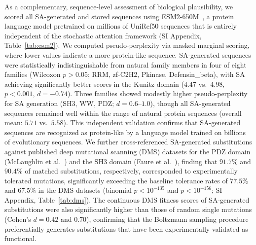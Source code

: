 As a complementary, sequence-level assessment of biological plausibility, we scored all SA-generated and stored sequences using ESM2-650M~\cite{linEvolutionaryScaleModeling2023}, a protein language model pretrained on millions of UniRef50 sequences that is entirely independent of the stochastic attention framework (SI Appendix, Table~\ref{tab:esm2}). We computed pseudo-perplexity via masked marginal scoring, where lower values indicate a more protein-like sequence. SA-generated sequences were statistically indistinguishable from natural family members in four of eight families (Wilcoxon $p > 0.05$; RRM, zf-C2H2, Pkinase, Defensin\_beta), with SA achieving significantly better scores in the Kunitz domain ($4.47$ vs.\ $4.98$, $p < 0.001$, $d{=}{-}0.74$). Three families showed modestly higher pseudo-perplexity for SA generation (SH3, WW, PDZ; $d{=}0.6$--$1.0$), though all SA-generated sequences remained well within the range of natural protein sequences (overall mean: $5.71$ vs.\ $5.58$). This independent validation confirms that SA-generated sequences are recognized as protein-like by a language model trained on billions of evolutionary sequences. We further cross-referenced SA-generated substitutions against published deep mutational scanning (DMS) datasets for the PDZ domain (McLaughlin et al.~\cite{mclaughlinSpatialArchitecture2012}) and the SH3 domain (Faure et al.~\cite{faureDoubleDMS2022}), finding that $91.7\%$ and $90.4\%$ of matched substitutions, respectively, corresponded to experimentally tolerated mutations, significantly exceeding the baseline tolerance rates of $77.5\%$ and $67.5\%$ in the DMS datasets (binomial $p < 10^{-135}$ and $p < 10^{-156}$; SI Appendix, Table~\ref{tab:dms}). The continuous DMS fitness scores of SA-generated substitutions were also significantly higher than those of random single mutations (Cohen's $d{=}0.42$ and $0.70$), confirming that the Boltzmann sampling procedure preferentially generates substitutions that have been experimentally validated as functional.

